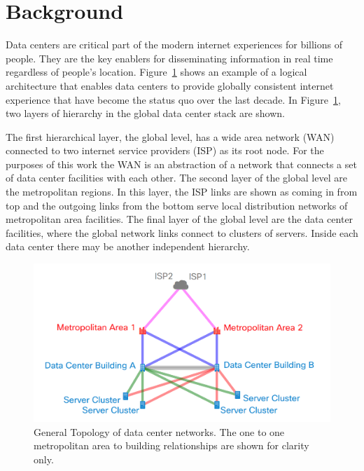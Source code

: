 \section{Background}
Data centers are critical part of the modern internet experiences for billions of people. They are the key enablers for disseminating information in real time regardless of people's location. Figure~\ref{fig:net_diag} shows an example of a logical architecture that enables data centers to provide globally consistent internet experience that have become the status quo over the last decade. In Figure~\ref{fig:net_diag}, two layers of hierarchy in the global data center stack are shown. 

The first hierarchical layer, the global level, has a wide area network (WAN) connected to two internet service providers (ISP) as its root node. For the purposes of this work the WAN is an abstraction of a network that connects a set of data center facilities with each other. The second layer of the global level are the metropolitan regions. In this layer, the ISP links are shown as coming in from top and the outgoing links from the bottom serve local distribution networks of metropolitan area facilities. The final layer of the global level are the data center facilities, where the global network links connect to clusters of servers. Inside each data center there may be another independent hierarchy.

\begin{figure}
  \centering
  \includegraphics[scale=.2]{marginal_energy_cost/img/net_diag.png}
  \caption[Generic Network Topology]{General Topology of data center networks. The one to one metropolitan area to building relationships are shown for clarity only.}
  \label{fig:net_diag}
  \end{figure}



